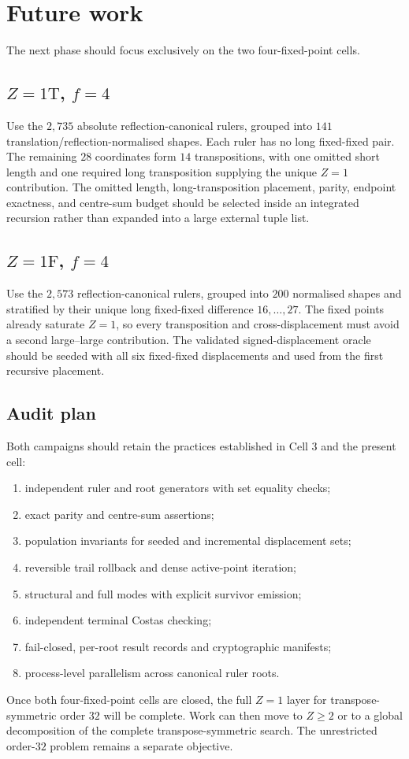 \documentclass[11pt,a4paper]{article}
\begin{document}
\section{Future work}
The next phase should focus exclusively on the two four-fixed-point cells.

\subsection{$Z=1\mathrm T$, $f=4$}
Use the $2{,}735$ absolute reflection-canonical rulers, grouped into $141$ translation/reflection-normalised shapes. Each ruler has no long fixed-fixed pair. The remaining $28$ coordinates form $14$ transpositions, with one omitted short length and one required long transposition supplying the unique $Z=1$ contribution. The omitted length, long-transposition placement, parity, endpoint exactness, and centre-sum budget should be selected inside an integrated recursion rather than expanded into a large external tuple list.

\subsection{$Z=1\mathrm F$, $f=4$}
Use the $2{,}573$ reflection-canonical rulers, grouped into $200$ normalised shapes and stratified by their unique long fixed-fixed difference $16,\ldots,27$. The fixed points already saturate $Z=1$, so every transposition and cross-displacement must avoid a second large--large contribution. The validated signed-displacement oracle should be seeded with all six fixed-fixed displacements and used from the first recursive placement.

\subsection{Audit plan}
Both campaigns should retain the practices established in Cell 3 and the present cell:
\begin{enumerate}
\item independent ruler and root generators with set equality checks;
\item exact parity and centre-sum assertions;
\item population invariants for seeded and incremental displacement sets;
\item reversible trail rollback and dense active-point iteration;
\item structural and full modes with explicit survivor emission;
\item independent terminal Costas checking;
\item fail-closed, per-root result records and cryptographic manifests;
\item process-level parallelism across canonical ruler roots.
\end{enumerate}
Once both four-fixed-point cells are closed, the full $Z=1$ layer for transpose-symmetric order $32$ will be complete. Work can then move to $Z\ge2$ or to a global decomposition of the complete transpose-symmetric search. The unrestricted order-$32$ problem remains a separate objective.
\end{document}
